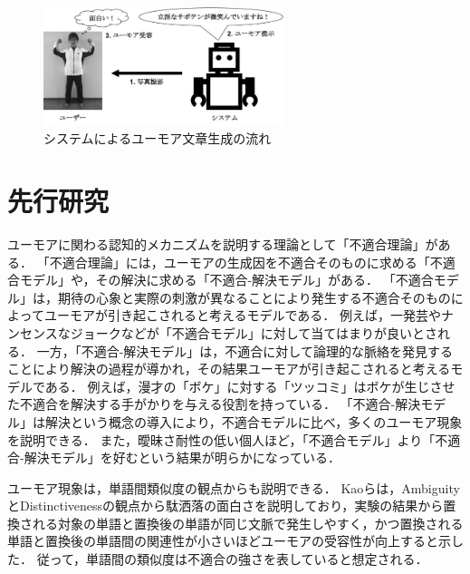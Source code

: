 \documentclass[twocolumn,2pt]{jarticle}
\begin{document}
\begin{figure}
	\begin{center}
		\includegraphics[width=7cm]{images/abstract_gray.jpg}
		\caption{システムによるユーモア文章生成の流れ}
		\label{fig:conf}
	\end{center}
\end{figure}


\section{先行研究}
ユーモアに関わる認知的メカニズムを説明する理論として「不適合理論\cite{incongruity}」がある．
「不適合理論」には，ユーモアの生成因を不適合そのものに求める「不適合モデル\cite{incongruity}」や，その解決に求める「不適合-解決モデル\cite{resolution}」がある．
「不適合モデル」は，期待の心象と実際の刺激が異なることにより発生する不適合そのものによってユーモアが引き起こされると考えるモデルである．
例えば，一発芸やナンセンスなジョークなどが「不適合モデル」に対して当てはまりが良いとされる．
一方，「不適合-解決モデル」は，不適合に対して論理的な脈絡を発見することにより解決の過程が導かれ，その結果ユーモアが引き起こされると考えるモデルである．
例えば，漫才の「ボケ」に対する「ツッコミ」はボケが生じさせた不適合を解決する手がかりを与える役割を持っている．
「不適合-解決モデル」は解決という概念の導入により，不適合モデルに比べ，多くのユーモア現象を説明できる\cite{統合モデル}．
また，曖昧さ耐性の低い個人ほど，「不適合モデル」より「不適合-解決モデル」を好むという結果が明らかになっている\cite{Ruch}．


ユーモア現象は，単語間類似度の観点からも説明できる．
Kaoらは，AmbiguityとDistinctivenessの観点から駄洒落の面白さを説明しており，実験の結果から置換される対象の単語と置換後の単語が同じ文脈で発生しやすく，かつ置換される単語と置換後の単語間の関連性が小さいほどユーモアの受容性が向上すると示した\cite{kao}．
従って，単語間の類似度は不適合の強さを表していると想定される．
\end{document}
